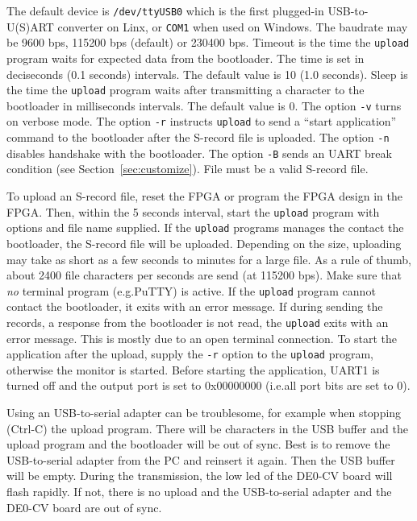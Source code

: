 \documentclass[12pt]{article}
\begin{document}
The default device is \lstinline|/dev/ttyUSB0| which is the first plugged-in USB-to-U(S)ART converter on Linx, or \lstinline|COM1| when used on Windows. The baudrate may be 9600 bps, 115200 bps (default) or 230400 bps. Timeout is the time the \lstinline|upload| program waits for expected data from the bootloader. The time is set in deciseconds (0.1 seconds) intervals. The default value is 10 (1.0 seconds). Sleep is the time the \lstinline|upload| program waits after transmitting a character to the bootloader in milliseconds intervals. The default value is 0. The option \lstinline|-v| turns on verbose mode. The option \lstinline[]|-r| instructs \lstinline|upload| to send a ``start application'' command to the bootloader after the S-record file is uploaded. The option \lstinline|-n| disables handshake with the bootloader. The option \lstinline|-B| sends an UART break condition (see Section~\ref{sec:customize}). File must be a valid S-record file.

To upload an S-record file, reset the FPGA or program the FPGA design in the FPGA. Then, within the 5 seconds interval, start the \lstinline|upload| program with options and file name supplied. If the \lstinline|upload| programs manages the contact the bootloader, the S-record file will be uploaded. Depending on the size, uploading may take as short as a few seconds to minutes for a large file. As a rule of thumb, about 2400 file characters per seconds are send (at 115200 bps). Make sure that \emph{no} terminal program (e.g.\@ PuTTY) is active. If the \lstinline|upload| program cannot contact the bootloader, it exits with an error message. If during sending the records, a response from the bootloader is not read, the \lstinline|upload| exits with an error message. This is mostly due to an open terminal connection. To start the application after the upload, supply the \lstinline|-r| option to the \lstinline|upload| program, otherwise the monitor is started. Before starting the application, UART1 is turned off and the output port is set to 0x00000000 (i.e.\@ all port bits are set to 0).

Using an USB-to-serial adapter can be troublesome, for example when stopping (Ctrl-C) the upload program. There will be characters in the USB buffer and the upload program and the bootloader will be out of sync. Best is to remove the USB-to-serial adapter from the PC and reinsert it again. Then the USB buffer will be empty. During the transmission, the low led of the DE0-CV board will flash rapidly. If not, there is no upload and the USB-to-serial adapter and the DE0-CV board are out of sync.
\end{document}
